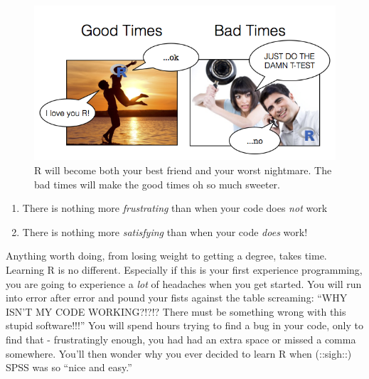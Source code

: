\documentclass[
]{book}
\begin{document}
\begin{figure}

{\centering \includegraphics[width=8.75in]{images/index/rrelationship} 

}

\caption{R will become both your best friend and your worst nightmare. The bad times will make the good times oh so much sweeter.}\label{fig:relationship}
\end{figure}

\begin{enumerate}
\def\labelenumi{\arabic{enumi}.}
\item
  There is nothing more \emph{frustrating} than when your code does \emph{not} work
\item
  There is nothing more \emph{satisfying} than when your code \emph{does} work!
\end{enumerate}

Anything worth doing, from losing weight to getting a degree, takes time. Learning R is no different. Especially if this is your first experience programming, you are going to experience a \emph{lot} of headaches when you get started. You will run into error after error and pound your fists against the table screaming: ``WHY ISN'T MY CODE WORKING?!?!? There must be something wrong with this stupid software!!!'' You will spend hours trying to find a bug in your code, only to find that - frustratingly enough, you had had an extra space or missed a comma somewhere. You'll then wonder why you ever decided to learn R when (::sigh::) SPSS was so ``nice and easy.''
\end{document}
